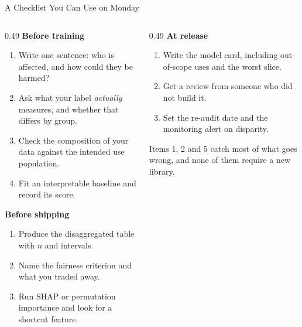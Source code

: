\begin{frame}{A Checklist You Can Use on Monday}

    \begin{columns}[T]
        \begin{column}{0.49\textwidth}
            \textbf{Before training}
            \begin{enumerate}\scriptsize
                \setlength\itemsep{0.28em}
                \item Write one sentence: who is affected, and how could they be harmed?
                \item Ask what your label \emph{actually} measures, and whether that differs by
                      group.
                \item Check the composition of your data against the intended use population.
                \item Fit an interpretable baseline and record its score.
            \end{enumerate}

            \vspace{0.6em}
            \textbf{Before shipping}
            \begin{enumerate}\scriptsize
                \setlength\itemsep{0.28em}
                \setcounter{enumi}{4}
                \item Produce the disaggregated table with $n$ and intervals.
                \item Name the fairness criterion and what you traded away.
                \item Run SHAP or permutation importance and look for a shortcut feature.
            \end{enumerate}
        \end{column}
        \begin{column}{0.49\textwidth}
            \textbf{At release}
            \begin{enumerate}\scriptsize
                \setlength\itemsep{0.28em}
                \setcounter{enumi}{7}
                \item Write the model card, including out-of-scope uses and the worst slice.
                \item Get a review from someone who did not build it.
                \item Set the re-audit date and the monitoring alert on disparity.
            \end{enumerate}

            \vspace{1.0em}
            \begin{tcolorbox}[colback=raiGreen!5, colframe=raiGreen!60, boxrule=0.7pt]
                \scriptsize
                Items 1, 2 and 5 catch most of what goes wrong, and none of them require a new
                library.
            \end{tcolorbox}
        \end{column}
    \end{columns}
\end{frame}

